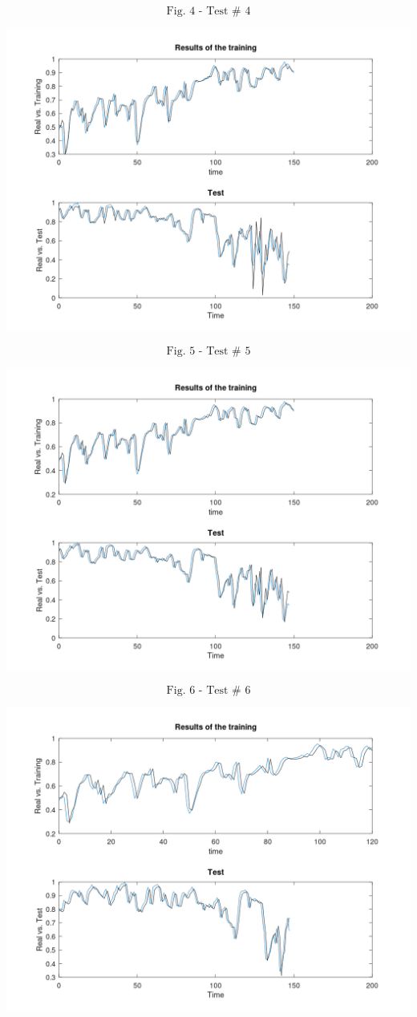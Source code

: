 \documentclass[conference,final,]{IEEEtran}
\makeatletter
\def\maxwidth{\ifdim\Gin@nat@width>\linewidth\linewidth
\else\Gin@nat@width\fi}
\let\Oldincludegraphics\includegraphics
\renewcommand{\includegraphics}[1]{\Oldincludegraphics[width=\maxwidth]{#1}}
\makeatother
\begin{document}
\[
\text{Fig. 4 - Test # 4}
\]

\includegraphics{../Figures/fig5.png}

\[
\text{Fig. 5 - Test # 5}
\]

\includegraphics{../Figures/fig6.png}

\[
\text{Fig. 6 - Test # 6}
\]

\includegraphics{../Figures/fig7.png}
\end{document}
